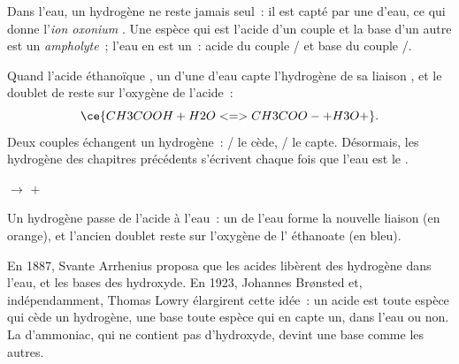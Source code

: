 \begin{definition}\label{def:g12:ka-and-pka:oxonium}
Dans l'eau, un  hydrogène ne reste jamais seul~: il est capté par une
 d'eau, ce qui donne l'\emph{ion oxonium}
. Une espèce qui est l'acide d'un couple et la base d'un autre
est un \emph{ampholyte}~; l'eau en est un~: acide du
couple
/ et base du couple /.
\end{definition}

\begin{example}\label{ex:g12:ka-and-pka:acid-water}
Quand l'acide éthanoïque , un  d'une 
d'eau capte l'hydrogène de sa liaison , et le doublet de
 reste sur l'oxygène de l'acide~:
\[
  \ce{CH3COOH + H2O <=> CH3COO- + H3O+} .
\]
Deux couples échangent un  hydrogène~: / le
cède,
/ le capte. Désormais, les  hydrogène des chapitres
précédents s'écrivent  chaque fois que l'eau est le .
\end{example}

\begin{omfigure}
\qquad
{}
\qquad$\longrightarrow$\qquad
{}\quad$+$\quad{}

{\small Un  hydrogène passe de l'acide à l'eau~: un 
de l'eau forme la nouvelle liaison  (en orange), et l'ancien
doublet  reste sur l'oxygène de l' éthanoate (en bleu).}
\end{omfigure}

\begin{history}
En 1887, Svante Arrhenius proposa que les acides libèrent des 
hydrogène dans l'eau, et les bases des  hydroxyde. En 1923, Johannes
Brønsted et, indépendamment, Thomas Lowry élargirent cette idée~: un
acide est toute espèce qui cède un  hydrogène, une base toute espèce
qui en capte un, dans l'eau ou non. La  d'ammoniac, qui ne
contient pas d'hydroxyde, devint une base comme les autres.
\end{history}

